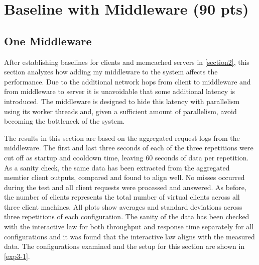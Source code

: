 \documentclass[11pt,a4paper]{article}
\begin{document}
\section{Baseline with Middleware (90 pts)}

\subsection{One Middleware} \label{sec3.1}
After establishing baselines for clients and memcached servers in \autoref{section2}, this section analyzes how adding my middleware to the system affects the performance. Due to the additional network hops from client to middleware and from middleware to server it is unavoidable that some additional latency is introduced. The middleware is designed to hide this latency with parallelism using its worker threads and, given a sufficient amount of parallelism, avoid becoming the bottleneck of the system.

The results in this section are based on the aggregated request logs from the middleware. The first and last three seconds of each of the three repetitions were cut off as startup and cooldown time, leaving 60 seconds of data per repetition. As a sanity check, the same data has been extracted from the aggregated memtier client outputs, compared and found to align well. No misses occurred during the test and all client requests were processed and answered. As before, the number of clients represents the total number of virtual clients across all three client machines. All plots show averages and standard deviations across three repetitions of each configuration. The sanity of the data has been checked with the interactive law for both throughput and response time separately for all configurations and it was found that the interactive law aligns with the measured data. The configurations examined and the setup for this section are shown in \autoref{exp3-1}.
\end{document}
